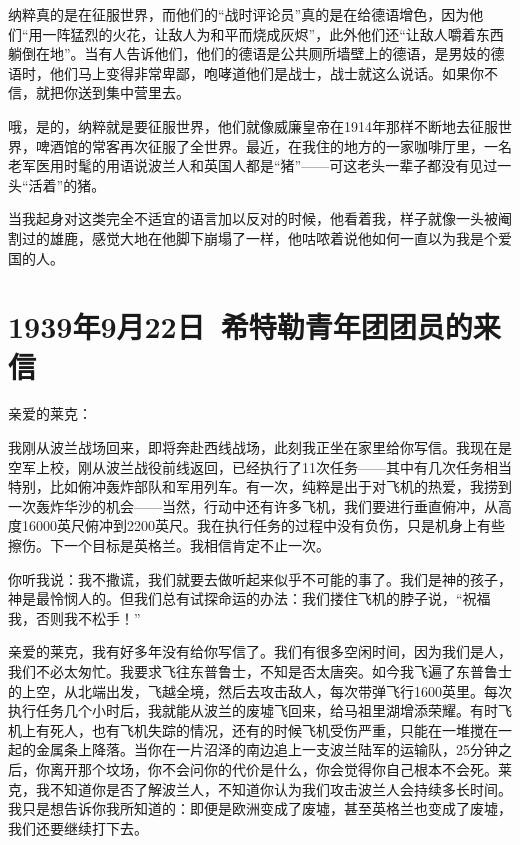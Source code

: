 \documentclass[UTF8]{ctexart}
\begin{document}
纳粹真的是在征服世界，而他们的“战时评论员”真的是在给德语增色，因为他们“用一阵猛烈的火花，让敌人为和平而烧成灰烬”，此外他们还“让敌人嚼着东西躺倒在地”。当有人告诉他们，他们的德语是公共厕所墙壁上的德语，是男妓的德语时，他们马上变得非常卑鄙，咆哮道他们是战士，战士就这么说话。如果你不信，就把你送到集中营里去。

哦，是的，纳粹就是要征服世界，他们就像威廉皇帝在1914年那样不断地去征服世界，啤酒馆的常客再次征服了全世界。最近，在我住的地方的一家咖啡厅里，一名老军医用时髦的用语说波兰人和英国人都是“猪”——可这老头一辈子都没有见过一头“活着”的猪。

当我起身对这类完全不适宜的语言加以反对的时候，他看着我，样子就像一头被阉割过的雄鹿，感觉大地在他脚下崩塌了一样，他咕哝着说他如何一直以为我是个爱国的人。

\section{1939年9月22日\ 希特勒青年团团员的来信}

亲爱的莱克：

我刚从波兰战场回来，即将奔赴西线战场，此刻我正坐在家里给你写信。我现在是空军上校，刚从波兰战役前线返回，已经执行了11次任务——其中有几次任务相当特别，比如俯冲轰炸部队和军用列车。有一次，纯粹是出于对飞机的热爱，我捞到一次轰炸华沙的机会——当然，行动中还有许多飞机，我们要进行垂直俯冲，从高度16000英尺俯冲到2200英尺。我在执行任务的过程中没有负伤，只是机身上有些擦伤。下一个目标是英格兰。我相信肯定不止一次。

你听我说：我不撒谎，我们就要去做听起来似乎不可能的事了。我们是神的孩子，神是最怜悯人的。但我们总有试探命运的办法：我们搂住飞机的脖子说，“祝福我，否则我不松手！”

亲爱的莱克，我有好多年没有给你写信了。我们有很多空闲时间，因为我们是人，我们不必太匆忙。我要求飞往东普鲁士，不知是否太唐突。如今我飞遍了东普鲁士的上空，从北端出发，飞越全境，然后去攻击敌人，每次带弹飞行1600英里。每次执行任务几个小时后，我就能从波兰的废墟飞回来，给马祖里湖增添荣耀。有时飞机上有死人，也有飞机失踪的情况，还有的时候飞机受伤严重，只能在一堆搅在一起的金属条上降落。当你在一片沼泽的南边追上一支波兰陆军的运输队，25分钟之后，你离开那个坟场，你不会问你的代价是什么，你会觉得你自己根本不会死。莱克，我不知道你是否了解波兰人，不知道你认为我们攻击波兰人会持续多长时间。我只是想告诉你我所知道的：即便是欧洲变成了废墟，甚至英格兰也变成了废墟，我们还要继续打下去。
\end{document}
